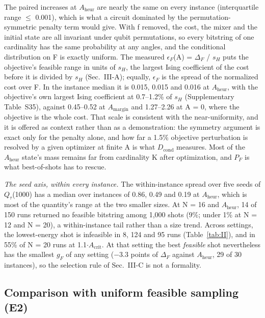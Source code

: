 \documentclass{ieeeaccess}
\begin{document}
The paired increases at $A_{\mathrm{heur}}$ are nearly the same on every instance (interquartile range $\leq$ 0.001), which is what a circuit dominated by the permutation-symmetric penalty term would give. With f removed, the cost, the mixer and the initial state are all invariant under qubit permutations, so every bitstring of one cardinality has the same probability at any angles, and the conditional distribution on F is exactly uniform. The measured $\epsilon_{F}$(A) = $\Delta_{F}$ / $s_{H}$ puts the objective's feasible range in units of $s_{H}$, the largest Ising coefficient of the cost before it is divided by $s_{H}$ (Sec.~III-A); equally, $\epsilon_{F}$ is the spread of the normalized cost over F. In the instance median it is 0.015, 0.015 and 0.016 at $A_{\mathrm{heur}}$, with the objective's own largest Ising coefficient at 0.7--1.2\% of $s_{H}$ (Supplementary Table~S35), against 0.45--0.52 at $A_{\mathrm{margin}}$ and 1.27--2.26 at A = 0, where the objective is the whole cost. That scale is consistent with the near-uniformity, and it is offered as context rather than as a demonstration: the symmetry argument is exact only for the penalty alone, and how far a 1.5\% objective perturbation is resolved by a given optimizer at finite A is what $D_{\mathrm{cond}}$ measures. Most of the $A_{\mathrm{heur}}$ state's mass remains far from cardinality K after optimization, and $P_{F}$ is what best-of-shots has to rescue.


\textit{The seed axis, within every instance.} The within-instance spread over five seeds of $Q_{\tau}$(1000) has a median over instances of 0.86, 0.49 and 0.19 at $A_{\mathrm{heur}}$, which is most of the quantity's range at the two smaller sizes. At N = 16 and $A_{\mathrm{heur}}$, 14 of 150 runs returned no feasible bitstring among 1,000 shots (9\%; under 1\% at N = 12 and N = 20), a within-instance tail rather than a size trend. Across settings, the lowest-energy shot is infeasible in 8, 124 and 95 runs (Table~\ref{tab:II}), and in 55\% of N = 20 runs at 1.1$\cdot$$A_{\mathrm{crit}}$. At that setting the best \textit{feasible} shot nevertheless has the smallest $g_{F}$ of any setting ($-$3.3 points of $\Delta_{F}$ against $A_{\mathrm{heur}}$, 29 of 30 instances), so the selection rule of Sec.~III-C is not a formality.


\subsection{Comparison with uniform feasible sampling (E2)}
\end{document}
